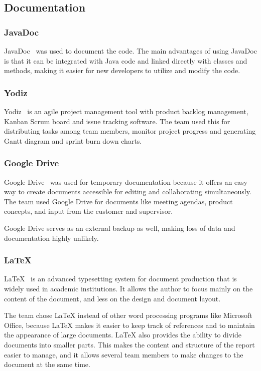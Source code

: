 \subsection{Documentation}

\subsubsection{JavaDoc}
JavaDoc~\cite{javadoc} was used to document the code. The main advantages of using JavaDoc is that it can be integrated with Java code and linked directly with classes and methods, making it easier for new developers to utilize and modify the code.

\subsubsection{Yodiz}
Yodiz~\cite{yodiz} is an agile project management tool with product backlog management, Kanban Scrum board and issue tracking software. The team used this for distributing tasks among team members, monitor project progress and generating Gantt diagram and sprint burn down charts.

\subsubsection{Google Drive}
Google Drive~\cite{gdrive} was used for temporary documentation because it offers an easy way to create documents accessible for editing and collaborating simultaneously. The team used Google Drive for documents like meeting agendas, product concepts, and input from the customer and supervisor. 

Google Drive serves as an external backup as well, making loss of data and documentation highly unlikely.

\subsubsection{\LaTeX}
\LaTeX~\cite{latex} is an advanced typesetting system for document production that is widely used in
academic institutions. It allows the author to focus mainly on the content of the document, and less on the design and document layout.

The team chose LaTeX instead of other word processing programs like Microsoft Office, because LaTeX makes it easier to keep track of references and to maintain the appearance of large documents. 
LaTeX also provides the ability to divide documents into smaller parts. This makes the content and structure of the report easier to manage, and it allows several team members to make changes to the document at the same time.

